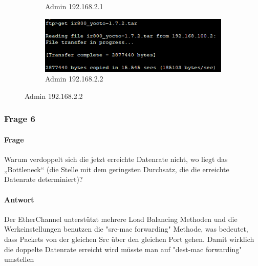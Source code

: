 \begin{figure}[!htb]
\begin{subfigure}{.45\textwidth}
        \caption{Admin 192.168.2.1}
    \end{subfigure}
    \begin{subfigure}{.45\textwidth}
        \includegraphics[width=\textwidth,height=\textwidth,keepaspectratio]{./img/lacp/admin1.png}
        \caption{Admin 192.168.2.2}
    \end{subfigure}
\end{figure}
\subsubsection{Frage 6}
\paragraph{Frage}
Warum verdoppelt sich die jetzt erreichte Datenrate nicht, wo liegt das
„Bottleneck“ (die Stelle mit dem geringsten Durchsatz, die die erreichte
Datenrate determiniert)?
\paragraph{Antwort}
Der EtherChannel unterstützt mehrere Load Balancing Methoden und die Werkeinstellungen benutzen die "src-mac forwarding" Methode, was bedeutet, dass Packets von der gleichen Src über den gleichen Port gehen. Damit wirklich die doppelte Datenrate erreicht wird müsste man auf "dest-mac forwarding" umstellen